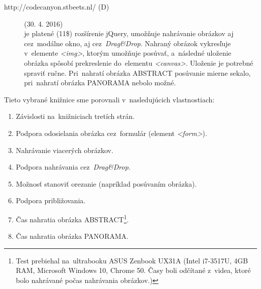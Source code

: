 \begin{description}
	
	\item[http://codecanyon.stbeets.nl/ (D)](30. 4. 2016)\\
	je platené (11\$) rozšírenie jQuery, umožňuje nahrávanie obrázkov aj cez~modálne okno, aj cez~\emph{Drag\&Drop}. Nahraný obrázok vykresľuje v~elemente \emph{<img>}, ktorým umožňuje posúvať, a~následné uloženie obrázka spôsobí prekreslenie do~elementu \emph{<canvas>}. Uloženie je potrebné spraviť ručne. Pri~nahratí obrázka ABSTRACT posúvanie mierne sekalo, pri~nahratí obrázka PANORAMA nebolo možné.

\end{description}

Tieto vybrané knižnice sme porovnali v~nasledujúcich vlastnostiach:
\begin{enumerate}
	\item Závislosti na~knižniciach tretích strán.
	\item Podpora odosielania obrázka cez~formulár (element \emph{<form>}).
	\item Nahrávanie viacerých obrázkov.
	\item Podpora nahrávania cez~\emph{Drag\&Drop}.
	\item Možnosť stanoviť orezanie (napríklad posúvaním obrázka).
	\item Podpora približovania.
	\item Čas nahratia obrázka ABSTRACT\footnote{Test prebiehal na~ultrabooku ASUS Zenbook UX31A (Intel i7-3517U, 4GB RAM, Microsoft Windows 10, Chrome 50. Časy boli odčítané z~videa, ktoré bolo nahrávané počas nahrávania obrázkov.) }.
	\item Čas nahratia obrázka PANORAMA\footnotemark[\value{footnote}].
\end{enumerate}

